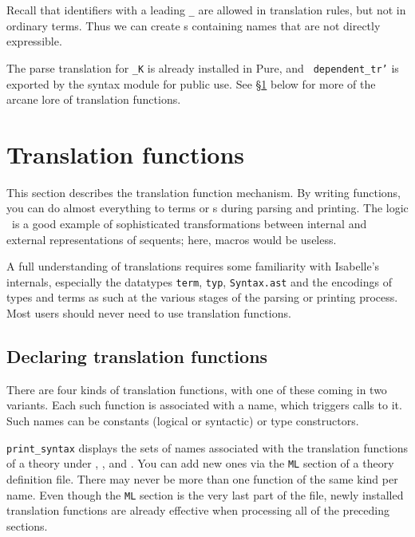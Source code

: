 Recall that identifiers with a leading {\tt _} are allowed in translation
rules, but not in ordinary terms.  Thus we can create \AST{}s containing
names that are not directly expressible.

The parse translation for {\tt _K} is already installed in Pure, and {\tt
dependent_tr'} is exported by the syntax module for public use.  See
\S\ref{sec:tr_funs} below for more of the arcane lore of translation functions.


\section{Translation functions} \label{sec:tr_funs}
%
This section describes the translation function mechanism.  By writing
\ML{} functions, you can do almost everything to terms or \AST{}s
during parsing and printing.  The logic \LK\ is a good example of
sophisticated transformations between internal and external
representations of sequents; here, macros would be useless.

A full understanding of translations requires some familiarity
with Isabelle's internals, especially the datatypes {\tt term}, {\tt typ},
{\tt Syntax.ast} and the encodings of types and terms as such at the various
stages of the parsing or printing process.  Most users should never need to
use translation functions.

\subsection{Declaring translation functions}
There are four kinds of translation functions, with one of these
coming in two variants.  Each such function is associated with a name,
which triggers calls to it.  Such names can be constants (logical or
syntactic) or type constructors.

{\tt print_syntax} displays the sets of names associated with the
translation functions of a theory under
, ,
 and .  You
can add new ones via the {\tt ML} section of a
theory definition file.  There may never be more than one function of
the same kind per name.  Even though the {\tt ML} section is the very
last part of the file, newly installed translation functions are
already effective when processing all of the preceding sections.

